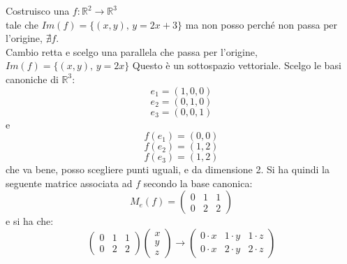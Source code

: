 \documentclass[a4paper,12pt, oneside]{book}
\begin{document}
\begin{esercizio}
	Costruisco una $f:\mathbb{R}^2\rightarrow \mathbb{R}^3$\\ tale che $Im(f)=\{(x,y),\, y=2x+3\}$
	ma non posso perché non passa per l'origine, $\nexists f$.\\
	Cambio retta e scelgo una parallela che passa per l'origine,\\ $Im(f)=\{(x,y),\, y=2x\}$
	Questo è un sottospazio vettoriale.
	Scelgo le basi canoniche di $\mathbb{R}^3$:
	$$e_1=(1,0,0)$$
	$$e_2=(0,1,0)$$
	$$e_3=(0,0,1)$$
	e
	$$f(e_1)=(0,0)$$
	$$f(e_2)=(1,2)$$
	$$f(e_3)=(1,2)$$
	che va bene, posso scegliere punti uguali, e da dimensione 2. Si ha quindi la seguente matrice associata ad $f$ secondo la base canonica:
	$$
		M_e(f)=\left(\begin{matrix}
				0 & 1 & 1 \\
				0 & 2 & 2
			\end{matrix}\right)
	$$
	e si ha che:
	$$\left(\begin{matrix}
				0 & 1 & 1 \\
				0 & 2 & 2
			\end{matrix}\right)\left(\begin{matrix}
				x \\
				y \\
				z
			\end{matrix}\right)\rightarrow \left(\begin{matrix}
				0 \cdot x & 1 \cdot y & 1\cdot z \\
				0 \cdot x & 2 \cdot y & 2\cdot z
			\end{matrix}\right)$$
\end{esercizio}
\end{document}
